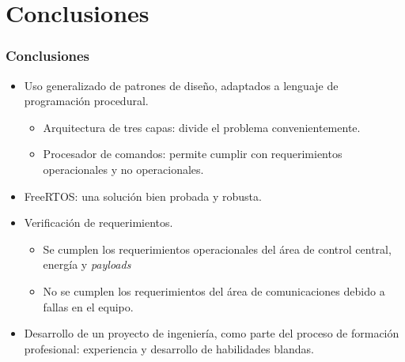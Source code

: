 \documentclass[xcolor=dvipsnames]{beamer}
\begin{document}
    \begin{frame}
        \centering \Large {}
        
    \end{frame}

    \section{Conclusiones}
    \begin{frame}
        \frametitle{Conclusiones}
        \begin{itemize}
            \item Uso generalizado de patrones de diseño, adaptados a lenguaje de programación procedural.
            \begin{itemize}
                \item Arquitectura de tres capas: divide el problema convenientemente.
                \item Procesador de comandos: permite cumplir con requerimientos operacionales y no operacionales.
            \end{itemize}
            
            \item FreeRTOS: una solución bien probada y robusta.
            \item Verificación de requerimientos.
            \begin{itemize}
                \item Se cumplen los requerimientos operacionales del área de control central, energía y \textit{payloads}
                \item No se cumplen los requerimientos del área de comunicaciones debido a fallas en el equipo.
            \end{itemize}
            \item Desarrollo de un proyecto de ingeniería, como parte del proceso de formación profesional: experiencia y desarrollo de habilidades blandas.

        \end{itemize}

    \end{frame}
    
\end{document}
